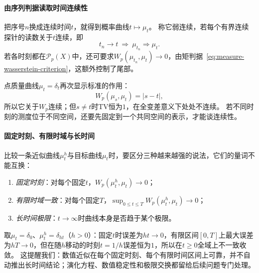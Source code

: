 \paragraph{由序列判据读取时间连续性}

把序号$n$换成连续时间$t$，就得到概率曲线$t\mapsto\mu_t$。
称它弱连续，若每个有界连续探针的读数关于$t$连续，即
\[
 t_n\to t\ \Longrightarrow\ \mu_{t_n}\Rightarrow\mu_t.
\]
若各时刻都在$\mathcal P_p(X)$中，还可要求$W_p(\mu_{t_n},\mu_t)\to0$，由矩判据~\eqref{eq:measure-wasserstein-criterion}，这额外控制了尾部。

点质量曲线$\mu_t=\delta_t$再次显示标准的作用：
\[
 W_p(\mu_s,\mu_t)=|s-t|,
\]
所以它关于$W_p$连续；但$s\neq t$时TV恒为$1$，在全变差意义下处处不连续。
若不同时刻的测度位于不同空间，还要先固定到一个共同空间的表示，才能谈连续性。

\paragraph{固定时刻、有限时域与长时间}

比较一条近似曲线$\mu_t^h$与目标曲线$\mu_t$时，要区分三种越来越强的说法，它们的量词不能互换：
\begin{enumerate}
 \item \emph{固定时刻}：对每个固定$t$，$W_p(\mu_t^h,\mu_t)\to0$；
 \item \emph{有限时域一致}：对每个固定$T$，$\sup_{0\leq t\leq T}W_p(\mu_t^h,\mu_t)\to0$；
 \item \emph{长时间极限}：$t\to\infty$时曲线本身是否趋于某个极限。
\end{enumerate}
取$\mu_t=\delta_0$、$\mu_t^h=\delta_{ht}$（$h>0$）：固定$t$时误差为$ht\to0$，有限区间$[0,T]$上最大误差为$hT\to0$，但在随$h$移动的时刻$t=1/h$误差恒为$1$，所以在$t\geq0$全域上不一致收敛。
这提醒我们：数值近似在每个固定时刻、每个有限时间区间上可靠，并不自动推出长时间结论；演化方程、数值稳定性和极限交换都留给后续问题专门处理。
